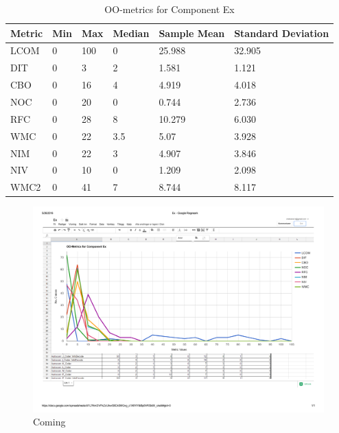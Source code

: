 \begin{table}[]
\centering
\caption{OO-metrics for Component Ex}
\label{tab:oometrics-ex}
\begin{tabular}{|l|l|l|l|l|l|}
\hline
\textbf{Metric} & \textbf{Min} & \textbf{Max} & \textbf{Median} & \textbf{Sample Mean} & \textbf{Standard Deviation} \\ \hline
LCOM            & 0           & 100          & 0               & 25.988               & 32.905                      \\ \hline
DIT             & 0            & 3            & 2               & 1.581                & 1.121                       \\ \hline
CBO             & 0            & 16           & 4               & 4.919                & 4.018                       \\ \hline
NOC             & 0            & 20           & 0               & 0.744                & 2.736                       \\ \hline
RFC             & 0            & 28           & 8               & 10.279               & 6.030                       \\ \hline
WMC             & 0            & 22           & 3.5             & 5.07                 & 3.928                       \\ \hline
NIM             & 0            & 22           & 3               & 4.907                & 3.846                       \\ \hline
NIV             & 0            & 10           & 0               & 1.209                & 2.098                       \\ \hline
WMC2            & 0            & 41          & 7              & 8.744                 & 8.117                      \\ \hline
\end{tabular}
\end{table}


\begin{landscape}
\setlength\LTleft{-.5in}
	\begin{figure}
	\centering
	\includegraphics[width=\textwidth]{images/ex.pdf}
	\caption{Coming}
	\label{fig:exgraph}
	\end{figure}
\end{landscape}


